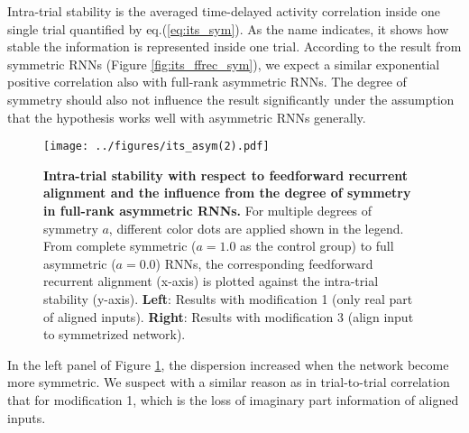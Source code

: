 \documentclass[11pt]{article}
\begin{document}
	Intra-trial stability is the averaged time-delayed activity correlation inside one single trial quantified by eq.(\ref{eq:its_sym}). As the name indicates, it shows how stable the information is represented inside one trial. According to the result from symmetric RNNs (Figure \ref{fig:its_ffrec_sym}), we expect a similar exponential positive correlation also with full-rank asymmetric RNNs. The degree of symmetry should also not influence the result significantly under the assumption that the hypothesis works well with asymmetric RNNs generally.
	
		\begin{figure}[H]
			\centering
			\texttt{[image: ../figures/its\_asym(2).pdf]}
			\caption[Intra-trial stability with respect to feedforward recurrent alignment and the influence from the degree of symmetry in full-rank asymmetric RNNs]{\textbf{Intra-trial stability with respect to feedforward recurrent alignment and the influence from the degree of symmetry in full-rank asymmetric RNNs.} For multiple degrees of symmetry $a$, different color dots are applied shown in the legend. From complete symmetric ($a = 1.0$ as the control group) to full asymmetric ($a = 0.0$) RNNs, the corresponding feedforward recurrent alignment (x-axis) is plotted against the intra-trial stability (y-axis). \textbf{Left}: Results with modification 1 (only real part of aligned inputs). \textbf{Right}: Results with modification 3 (align input to symmetrized network).}
			\label{fig:its_asym}
		\end{figure}
	
	In the left panel of Figure \ref{fig:its_asym}, the dispersion increased when the network become more symmetric. We suspect with a similar reason as in trial-to-trial correlation that for modification 1, which is the loss of imaginary part information of aligned inputs.
	
\end{document}
